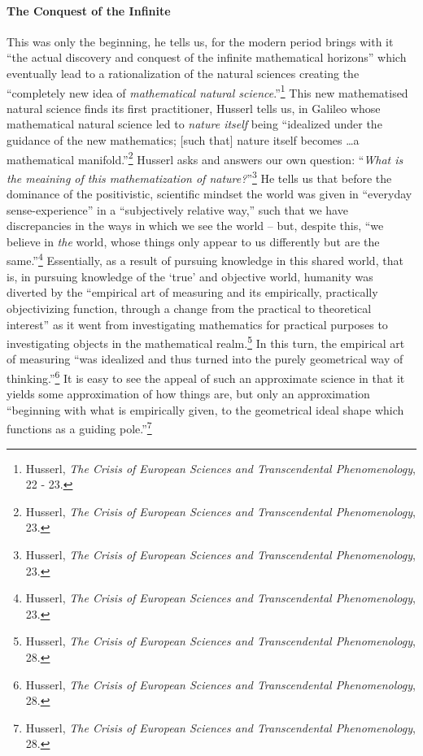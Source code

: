 \documentclass[12pt]{article}
\begin{document}
	\paragraph*{The Conquest of the Infinite} This was only the beginning, he tells us, for the modern period brings with it ``the actual discovery and conquest of the infinite mathematical horizons'' which eventually lead to a rationalization of the natural sciences creating the ``completely new idea of \emph{mathematical natural science}.''\footnote{Husserl, \emph{The Crisis of European Sciences and Transcendental Phenomenology}, 22 - 23.} This new mathematised natural science finds its first practitioner, Husserl tells us, in Galileo whose mathematical natural science led to \emph{nature itself} being ``idealized under the guidance of the new mathematics; [such that] nature itself becomes \ldots a mathematical manifold.''\footnote{Husserl, \emph{The Crisis of European Sciences and Transcendental Phenomenology}, 23.} Husserl asks and answers our own question: ``\emph{What is the meaining of this mathematization of nature?}''\footnote{Husserl, \emph{The Crisis of European Sciences and Transcendental Phenomenology}, 23.} He tells us that before the dominance of the positivistic, scientific mindset the world was given in ``everyday sense-experience'' in a ``subjectively relative way,'' such that we have discrepancies in the ways in which we see the world -- but, despite this, ``we believe in \emph{the} world, whose things only appear to us differently but are the same.''\footnote{Husserl, \emph{The Crisis of European Sciences and Transcendental Phenomenology}, 23.} Essentially, as a result of pursuing knowledge in this shared world, that is, in pursuing knowledge of the `true' and objective world, humanity was diverted by the ``empirical art of measuring and its empirically, practically objectivizing function, through a change from the practical to theoretical interest'' as it went from investigating mathematics for practical purposes to investigating objects in the mathematical realm.\footnote{Husserl, \emph{The Crisis of European Sciences and Transcendental Phenomenology}, 28.} In this turn, the empirical art of measuring ``was idealized and thus turned into the purely geometrical way of thinking.''\footnote{Husserl, \emph{The Crisis of European Sciences and Transcendental Phenomenology}, 28.} It is easy to see the appeal of such an approximate science in that it yields some approximation of how things are, but only an approximation ``beginning with what is empirically given, to the geometrical ideal shape which functions as a guiding pole.''\footnote{Husserl, \emph{The Crisis of European Sciences and Transcendental Phenomenology}, 28.}
\end{document}
